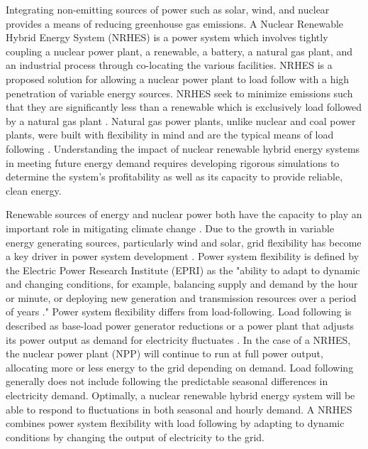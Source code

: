 \documentclass[12pt]{UIdahoMastersThesis}
\begin{document}
Integrating non-emitting sources of power such as solar, wind, and nuclear provides a means of reducing greenhouse gas emissions. A Nuclear Renewable Hybrid Energy System (NRHES) is a power system which involves tightly coupling a nuclear power plant, a renewable, a battery, a natural gas plant, and an industrial process through co-locating the various facilities.  NRHES is a proposed solution for allowing a nuclear power plant to load follow with a high penetration of variable energy sources. NRHES seek to minimize emissions such that they are significantly less than a renewable which is exclusively load followed by a natural gas plant \cite{Baker2016}.  Natural gas power plants, unlike nuclear and coal power plants, were built with flexibility in mind and are the typical means of load following \cite{MITEnergyInitiative2011}.  Understanding the impact of nuclear renewable hybrid energy systems in meeting future energy demand requires developing rigorous simulations to determine the system's profitability as well as its capacity to provide reliable, clean energy.

Renewable sources of energy and nuclear power both have the capacity to play an important role in mitigating climate change \cite {IPCC}. Due to the growth in variable energy generating sources, particularly wind and solar, grid flexibility has become a key driver in power system development \cite {Denholm2011}. Power system flexibility is defined by the Electric Power Research Institute (EPRI) as the "ability to adapt to dynamic and changing conditions, for example, balancing supply and demand by the hour or minute, or deploying new generation and transmission resources over a period of years \cite{EPRI2016}." Power system flexibility differs from load-following.  Load following is described as base-load power generator reductions \cite{Bragg-Sitton2014} or a power plant that adjusts its power output as demand for electricity fluctuates \cite{Masters2004}. In the case of a NRHES, the nuclear power plant (NPP) will continue to run at full power output, allocating more or less energy to the grid depending on demand. Load following generally does not include following the predictable seasonal differences in electricity demand.  Optimally, a nuclear renewable hybrid energy system will be able to respond to fluctuations in both seasonal and hourly demand. A NRHES combines power system flexibility with load following by adapting to dynamic conditions by changing the output of electricity to the grid.
\end{document}
